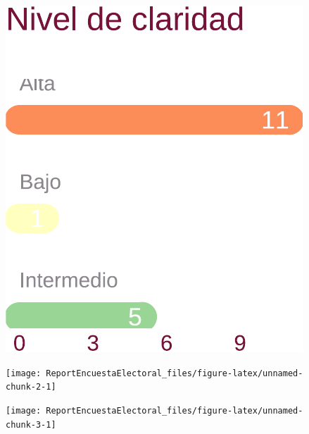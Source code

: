 \documentclass[10,a4paperpaper,]{article}
\begin{document}
\begin{figure}[!htb]
  \begin{minipage}{0.3\textwidth}
    \centering

\includegraphics[width=\textwidth]{ReportEncuestaElectoral_files/figure-latex/unnamed-chunk-1-1} 
  \end{minipage}\hfill
  \begin{minipage}{0.3\textwidth}
    \centering

\texttt{[image: ReportEncuestaElectoral\_files/figure-latex/unnamed-chunk-2-1]} 
  \end{minipage}
    \begin{minipage}{0.3\textwidth}
    \centering

\texttt{[image: ReportEncuestaElectoral\_files/figure-latex/unnamed-chunk-3-1]} 
  \end{minipage}
\end{figure}
\end{document}
